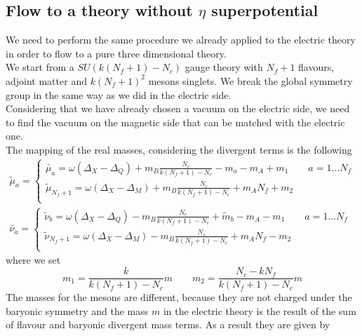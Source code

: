 \subsection{Flow to a theory without $\eta$ superpotential}
We need to perform the same procedure we already applied to the electric theory in order to flow to a pure three dimensional theory.\\
We start from a $SU( k(N_f +1) - N_c)$ gauge theory with $N_f +1$ flavours, adjoint matter and $k (N_f +1)^2$ mesons singlets.
We break the global symmetry group in the same way as we did in the electric side.\\
Considering that we have already chosen a vacuum on the electric side, we need to find the vacuum on the magnetic side that can be matched with the electric one.\\
The mapping of the real masses, considering the divergent terms is the following
\begin{equation}
\begin{aligned}
	 \tilde \mu_a =
	 \begin{cases}
		\tilde{ \mu_a} =  \omega ( \Delta_X - \Delta_Q ) + m_B \frac{N_c}{k(N_f +1) - N_c} - m_a  - m_A + m_1  \qquad a = 1 \dots N_f \\
		\tilde \mu_{N_f+1} =  \omega ( \Delta_X - \Delta_M ) + m_B \frac{N_c}{k(N_f +1) - N_c} +  m_A N_f + m_2    \\
	 \end{cases}
	 \\
	 \tilde{ \nu_a} =
	\begin{cases}
	\tilde{\nu}_b = \omega ( \Delta_X - \Delta_Q ) - m_B \frac{N_c}{k(N_f +1) - N_c}  + \tilde m_b  - m_A - m_1 \qquad a = 1 \dots N_f\\
	 \tilde \nu_{N_f+1} = \omega ( \Delta_X - \Delta_M ) - m_B \frac{N_c}{k(N_f +1) - N_c}  +  m_A N_f- m_2 \\
	\end{cases}
\end{aligned}
\end{equation}
where we set 
\begin{equation}
m_1  = \frac{k}{k(N_f+1)-N_c} m  \qquad
m_2  =  \frac{N_c - k N_f}{k(N_f+1)-N_c} m
\end{equation}
The masses for the mesons are different, because they are not charged under the baryonic symmetry and the mass $m$ in the electric theory is the result of the sum of flavour and baryonic divergent mass terms.
As a result they are given by
